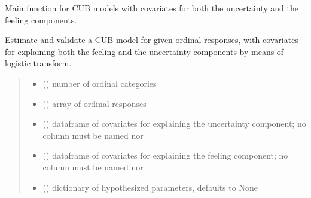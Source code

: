\documentclass[letterpaper,10pt,english]{sphinxmanual}
\begin{document}
\begin{fulllineitems}
\label{\detokenize{cubmods:cubmods.cub_yw.mle}}
\pysigstartsignatures
{}
\pysigstopsignatures
\sphinxAtStartPar
Main function for CUB models with covariates for both the uncertainty and the feeling components.

\sphinxAtStartPar
Estimate and validate a CUB model for given ordinal responses, with covariates for explaining both the
feeling and the uncertainty components by means of logistic transform.
\begin{quote}\begin{description}
\begin{itemize}
\item {} 
\sphinxAtStartPar
{} () \textendash{} number of ordinal categories

\item {} 
\sphinxAtStartPar
{} () \textendash{} array of ordinal responses

\item {} 
\sphinxAtStartPar
{} () \textendash{} dataframe of covariates for explaining the uncertainty component;
no column must be named  nor 

\item {} 
\sphinxAtStartPar
{} () \textendash{} dataframe of covariates for explaining the feeling component;
no column must be named  nor 

\item {} 
\sphinxAtStartPar
{} (\sphinxstyleliteralemphasis{\sphinxupquote{, }}) \textendash{} dictionary of hypothesized parameters, defaults to None


\end{itemize}
\end{description}
\end{quote}
\end{fulllineitems}
\end{document}
